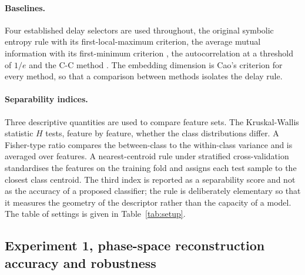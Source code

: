 \documentclass[10pt,a4paper,twocolumn]{article}
\begin{document}
\paragraph{Baselines.}
Four established delay selectors are used throughout, the original symbolic
entropy rule with its first-local-maximum criterion, the average mutual
information with its first-minimum criterion \citep{fraser1986}, the
autocorrelation at a threshold of $1/e$ \citep{abarbanel1996} and the C-C
method \citep{kim1999}.  The embedding dimension is Cao's criterion
\citep{cao1997} for every method, so that a comparison between methods
isolates the delay rule.

\paragraph{Separability indices.}
Three descriptive quantities are used to compare feature sets.  The
Kruskal-Wallis statistic $H$ tests, feature by feature, whether the class
distributions differ.  A Fisher-type ratio compares the between-class to the
within-class variance and is averaged over features.  A nearest-centroid rule
under stratified cross-validation standardises the features on the training
fold and assigns each test sample to the closest class centroid.  The third
index is reported as a separability score and not as the accuracy of a
proposed classifier; the rule is deliberately elementary so that it measures
the geometry of the descriptor rather than the capacity of a model.  The
table of settings is given in Table~\ref{tab:setup}.

\begin{table}[t]
\centering
\caption{Settings of the experiments.}
\label{tab:setup}
\small

\end{table}

\subsection{Experiment 1, phase-space reconstruction accuracy and robustness}
\label{sec:exp1}
\end{document}
